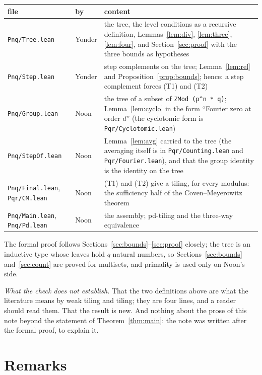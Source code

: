\documentclass[11pt,a4paper]{amsart}
\theoremstyle{definition}
\theoremstyle{remark}
\newcommand{\lean}[1]{\texttt{#1}}
\begin{document}
\smallskip
\begin{center}\footnotesize
\begin{tabular}{llp{}}
file & by & content\\\hline
\lean{Pnq/Tree.lean} & Yonder & the tree, the level conditions as a recursive definition, Lemmas~\ref{lem:div},
\ref{lem:three}, \ref{lem:four}, and Section~\ref{sec:proof} with the three bounds as hypotheses\\
\lean{Pnq/Step.lean} & Yonder & step complements on the tree; Lemma~\ref{lem:rel} and
Proposition~\ref{prop:bounds}; hence: a step complement forces (T1) and (T2)\\
\lean{Pnq/Group.lean} & Noon & the tree of a subset of \lean{ZMod (p\^{}n * q)}; Lemma~\ref{lem:cyclo} in the form
``Fourier zero at order $d$'' (the cyclotomic form is \lean{Pqr/Cyclotomic.lean})\\
\lean{Pnq/StepOf.lean} & Noon & Lemma~\ref{lem:avg} carried to the tree (the averaging itself is in
\lean{Pqr/Counting.lean} and \lean{Pqr/Fourier.lean}), and that the group identity is the identity on the tree\\
\lean{Pnq/Final.lean}, \lean{Pqr/CM.lean} & Noon & (T1) and (T2) give a tiling, for every modulus: the
sufficiency half of the Coven--Meyerowitz theorem\\
\lean{Pnq/Main.lean}, \lean{Pnq/Pd.lean} & Noon & the assembly; pd-tiling and the three-way equivalence\\
\end{tabular}
\end{center}
\smallskip

The formal proof follows Sections~\ref{sec:bounds}--\ref{sec:proof} closely; the tree is an inductive type
whose leaves hold $q$ natural numbers, so Sections~\ref{sec:bounds} and~\ref{sec:count} are proved for
multisets, and primality is used only on Noon's side.

\emph{What the check does not establish.} That the two definitions above are what the literature means by
weak tiling and tiling; they are four lines, and a reader should read them. That the result is new. And
nothing about the prose of this note beyond the statement of Theorem~\ref{thm:main}: the note was written
after the formal proof, to explain it.

\section{Remarks}
\end{document}

